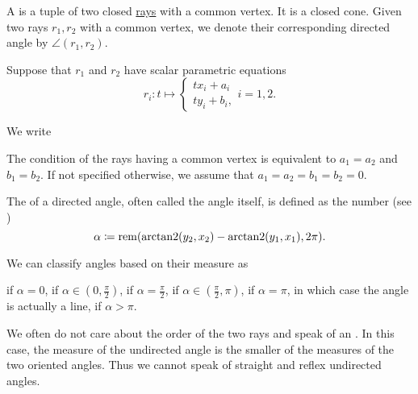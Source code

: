 \begin{Definition}\label{def:angle}
  A  is a tuple of two closed \hyperref[def:geometric_ray]{rays} with a common vertex. It is a closed cone. Given two rays \( r_1, r_2 \) with a common vertex, we denote their corresponding directed angle by \( \angle(r_1, r_2) \).

  Suppose that \( r_1 \) and \( r_2 \) have scalar parametric equations
  \begin{equation*}
    r_i: t \mapsto
    \begin{cases}
      tx_i + a_i \\
      ty_i + b_i,
    \end{cases}
    i = 1, 2.
  \end{equation*}

  We write

  The condition of the rays having a common vertex is equivalent to \( a_1 = a_2 \) and \( b_1 = b_2 \). If not specified otherwise, we assume that \( a_1 = a_2 = b_1 = b_2 = 0 \).

  The  of a directed angle, often called the angle itself, is defined as the number (see )
  \begin{equation*}
    \alpha \coloneqq \operatorname{rem}(\operatorname{arctan2}(y_2, x_2) - \operatorname{arctan2}(y_1, x_1), 2\pi).
  \end{equation*}

  We can classify angles based on their measure as
  \begin{DefEnum}
      if \( \alpha = 0 \),
      if \( \alpha \in (0, \tfrac \pi 2) \),
      if \( \alpha = \tfrac \pi 2 \),
      if \( \alpha \in (\tfrac \pi 2, \pi) \),
      if \( \alpha = \pi \), in which case the angle is actually a line,
      if \( \alpha > \pi \).
  \end{DefEnum}

  We often do not care about the order of the two rays and speak of an . In this case, the measure of the undirected angle is the smaller of the measures of the two oriented angles. Thus we cannot speak of straight and reflex undirected angles.
\end{Definition}

